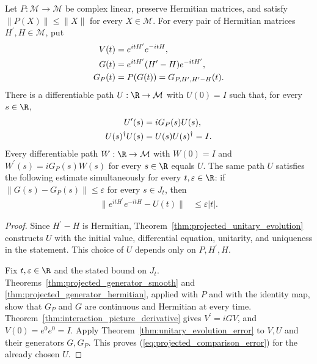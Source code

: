 \begin{theorem}
    \label{thm:projected_evolution_comparison}
    \leanok
    Let $P:\mathcal M\to\mathcal M$ be complex linear, preserve
    Hermitian matrices, and satisfy $\|P(X)\|\le\|X\|$ for every
    $X\in\mathcal M$. For every pair of Hermitian matrices
    $H^{\prime},H\in\mathcal M$, put
    \begin{align}
        V(t)&=e^{itH^{\prime}}e^{-itH},
        \label{eq:projected_comparison_generators}\\
        G(t)&=e^{itH^{\prime}}(H^{\prime}-H)e^{-itH^{\prime}},\notag\\
        G_P(t)&=P(G(t))=G_{P,H^{\prime},H^{\prime}-H}(t).\notag
    \end{align}
    There is a differentiable path $U:\R\to\mathcal M$ with $U(0)=I$
    such that, for every $s\in\R$,
    \begin{align}
        U^{\prime}(s)&=iG_P(s)U(s),
        \label{eq:projected_comparison_evolution}\\
        U(s)^\dagger U(s)&=U(s)U(s)^\dagger=I.\notag
    \end{align}
    Every differentiable path $W:\R\to\mathcal M$ with $W(0)=I$
    and $W^{\prime}(s)=iG_P(s)W(s)$ for every $s\in\R$ equals $U$.
    The same path $U$ satisfies the following estimate simultaneously
    for every $t,\varepsilon\in\R$: if
    $\|G(s)-G_P(s)\|\le\varepsilon$ for every $s\in J_t$, then
    \begin{align}
        \|e^{itH^{\prime}}e^{-itH}-U(t)\|&\le\varepsilon|t|.
        \label{eq:projected_comparison_error}
    \end{align}
\end{theorem}
\begin{proof}\leanok
    Since $H^{\prime}-H$ is Hermitian,
    Theorem~\ref{thm:projected_unitary_evolution} constructs $U$ with
    the initial value, differential equation, unitarity, and uniqueness
    in the statement. This choice of $U$ depends only on $P,H^{\prime},H$.

    Fix $t,\varepsilon\in\R$ and the stated bound on $J_t$.
    Theorems~\ref{thm:projected_generator_smooth} and
    \ref{thm:projected_generator_hermitian}, applied with $P$ and with
    the identity map, show that $G_P$ and $G$ are continuous and
    Hermitian at every time. Theorem~\ref{thm:interaction_picture_derivative}
    gives $V^{\prime}=iGV$, and $V(0)=e^0e^0=I$.
    Apply Theorem~\ref{thm:unitary_evolution_error} to $V,U$ and
    their generators $G,G_P$. This proves
    (\ref{eq:projected_comparison_error}) for the already chosen $U$.
\end{proof}

